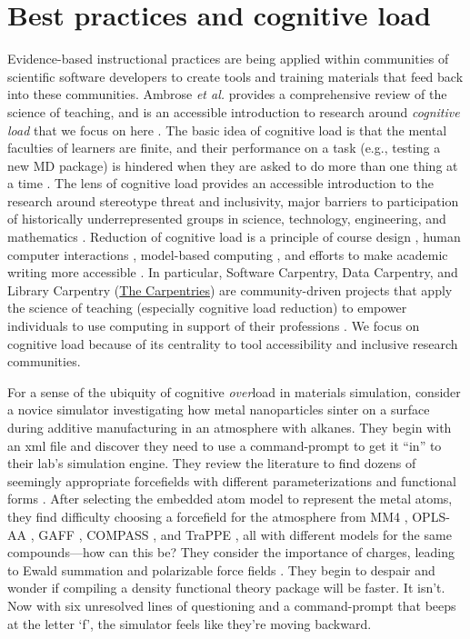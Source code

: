 \section{Best practices and cognitive load}\label{s:practice}
Evidence-based instructional practices are being applied within communities of scientific software developers to create tools and training materials that feed back into these communities. 
Ambrose \textit{et al.} provides a comprehensive review of the science of teaching, and is an accessible introduction to research around \textit{cognitive load} that we focus on here \cite{Ambrose2010}. 
The basic idea of cognitive load is that the mental faculties of learners are finite, and their performance on a task (e.g., testing a new MD package) is hindered when they are asked to do more than one thing at a time \cite{Kahneman1973}.
The lens of cognitive load provides an accessible introduction to the research around stereotype threat and inclusivity, major barriers to participation of historically underrepresented groups in science, technology, engineering, and mathematics \cite{cheryan2009ambient,Shapiro2012,Schinske2016}.
Reduction of cognitive load is a principle of course design \cite{Bart2019,Cook2006,Simperler2015,Teal2015,Wilson2014,Foundation2016a}, human computer interactions \cite{Hollender2010}, model-based computing \cite{Bohner2010,Varga2014}, and efforts to make academic writing more accessible \cite{Oppenheimer2006}.
In particular, Software Carpentry, Data Carpentry, and Library Carpentry (\href{https://carpentries.org}{The Carpentries}) are community-driven projects that apply the science of teaching (especially cognitive load reduction) to empower individuals to use computing in support of their professions \cite{Wilson2014,Wilson2014c,Simperler2015,Teal2015,Foundation2016a}.
We focus on cognitive load because of its centrality to tool accessibility and inclusive research communities.

For a sense of the ubiquity of cognitive \textit{over}load in materials simulation, consider a novice simulator investigating how metal nanoparticles sinter on a surface during additive manufacturing in an atmosphere with alkanes.
They begin with an xml file and discover they need to use a command-prompt to get it ``in'' to their lab's simulation engine.
They review the literature to find dozens of seemingly appropriate forcefields with different parameterizations and functional forms \cite{Ponder2003}.
After selecting the embedded atom model \cite{Daw1983} to represent the metal atoms, they find difficulty choosing a forcefield for the atmosphere from  MM4 \cite{Allinger1996}, OPLS-AA \cite{Jorgensen1988}, GAFF \cite{Wang2004}, COMPASS \cite{Sun1998}, and TraPPE \cite{Keasler2012}, all with different models for the same compounds---how can this be? 
They consider the importance of charges, leading to Ewald summation \cite{Lebard2012} and polarizable force fields \cite{Halgren2001}.
They begin to despair and wonder if compiling a density functional theory package will be faster.
It isn't.
Now with six unresolved lines of questioning and a command-prompt that beeps at the letter `f', the simulator feels like they're moving backward.

